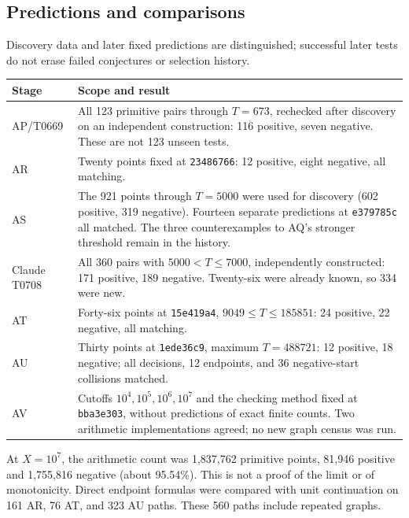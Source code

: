 \documentclass[11pt]{amsart}
\newcommand{\record}[1]{\nolinkurl{#1}}
\begin{document}
\subsection{Predictions and comparisons}
Discovery data and later fixed predictions are distinguished; successful
later tests do not erase failed conjectures or selection history.
\begin{longtable}{p{}p{}}
\toprule Stage & Scope and result\\\midrule\endhead
AP/T0669 & All 123 primitive pairs through $T=673$, rechecked after
discovery on an independent construction: 116 positive, seven negative.
These are not 123 unseen tests.\\
AR & Twenty points fixed at \record{23486766}: 12 positive, eight negative,
all matching.\\
AS & The 921 points through $T=5000$ were used for discovery (602 positive,
319 negative). Fourteen separate predictions at \record{e379785c} all
matched. The three counterexamples to AQ's stronger threshold remain
in the history.\\
Claude T0708 & All 360 pairs with $5000<T\le7000$, independently
constructed: 171 positive, 189 negative. Twenty-six were already known,
so 334 were new.\\
AT & Forty-six points at \record{15e419a4}, $9049\le T\le185851$:
24 positive, 22 negative, all matching.\\
AU & Thirty points at \record{1ede36c9}, maximum $T=488721$: 12 positive,
18 negative; all decisions, 12 endpoints, and 36 negative-start
collisions matched.\\
AV & Cutoffs $10^4,10^5,10^6,10^7$ and the checking method fixed at
\record{bba3e303}, without predictions of exact finite counts. Two
arithmetic implementations agreed; no new graph census was run.\\
\bottomrule
\end{longtable}
At $X=10^7$, the arithmetic count was 1,837,762 primitive points,
81,946 positive and 1,755,816 negative (about 95.54\%). This is not
a proof of the limit or of monotonicity. Direct endpoint formulas
were compared with unit continuation on 161 AR, 76 AT, and 323 AU
paths. These 560 paths include repeated graphs.
\end{document}
